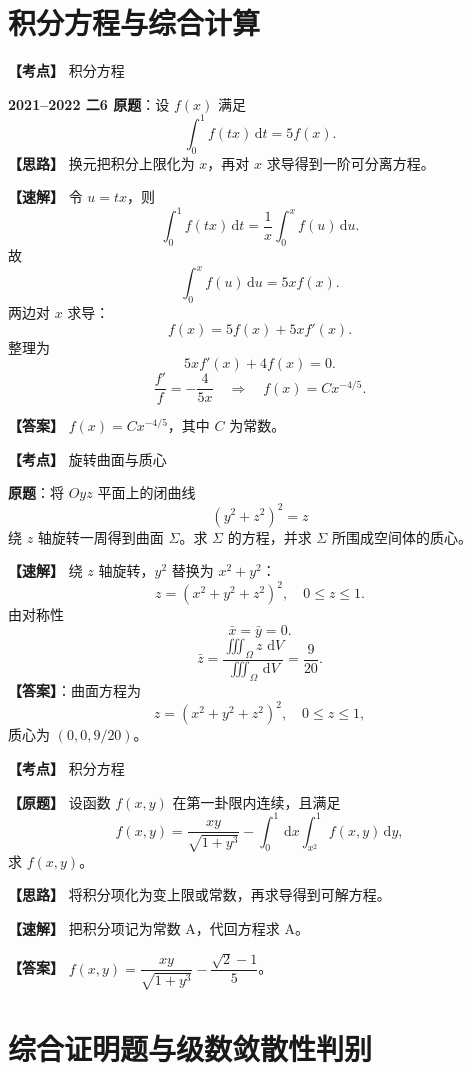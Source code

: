 ﻿\documentclass[11pt,a4paper,UTF8]{ctexart}
\newcommand{\dd}{\,\mathrm d}
\begin{document}
\section{积分方程与综合计算}

\begin{answerbox}[2021--2022 二-6]
\textbf{【考点】} 积分方程

\textbf{2021--2022 二6 原题}：设 $f(x)$ 满足
\[
\int_0^1 f(tx)\dd t=5f(x).
\]
\textbf{【思路】} 换元把积分上限化为 $x$，再对 $x$ 求导得到一阶可分离方程。

\textbf{【速解】}
令 $u=tx$，则
\[
\int_0^1 f(tx)\dd t=\frac1x\int_0^x f(u)\dd u.
\]
故
\[
\int_0^x f(u)\dd u=5xf(x).
\]
两边对 $x$ 求导：
\[
f(x)=5f(x)+5xf'(x).
\]
整理为
\[
5xf'(x)+4f(x)=0.
\]
\[
\frac{f'}f=-\frac4{5x}
\quad\Rightarrow\quad
f(x)=Cx^{-4/5}.
\]

\textbf{【答案】} $f(x)=Cx^{-4/5}$，其中 $C$ 为常数。

\end{answerbox}

\begin{answerbox}[2022--2023 三-12]
\textbf{【考点】} 旋转曲面与质心

\textbf{原题}：将 $Oyz$ 平面上的闭曲线
\[
(y^2+z^2)^2=z
\]
绕 $z$ 轴旋转一周得到曲面 $\Sigma$。求 $\Sigma$ 的方程，并求 $\Sigma$ 所围成空间体的质心。

\textbf{【速解】} 绕 $z$ 轴旋转，$y^2$ 替换为 $x^2+y^2$：
\[
z=(x^2+y^2+z^2)^2,
\quad 0\le z\le1.
\]
由对称性
\[
\bar x=\bar y=0.
\]
\[
\bar z=\frac{\iiint_\Omega z\,\dd V}{\iiint_\Omega \dd V}=\frac9{20}.
\]
\textbf{【答案】}：曲面方程为
\[
z=(x^2+y^2+z^2)^2,\quad 0\le z\le1,
\]
质心为 $(0,0,9/20)$。
\end{answerbox}

\newpage

\begin{answerbox}[2022--2023 二-3]
\textbf{【考点】} 积分方程

\textbf{【原题】} 设函数 $f(x,y)$ 在第一卦限内连续，且满足
\[
f(x,y)=\frac{xy}{\sqrt{1+y^3}}-\int_0^1\dd x\int_{x^2}^1f(x,y)\dd y,
\]
求 $f(x,y)$。

\textbf{【思路】} 将积分项化为变上限或常数，再求导得到可解方程。

\textbf{【速解】} 把积分项记为常数 A，代回方程求 A。

\textbf{【答案】} $f(x,y)=\dfrac{xy}{\sqrt{1+y^3}}-\dfrac{\sqrt2-1}{5}$。
\end{answerbox}
\section{综合证明题与级数敛散性判别}
\end{document}
